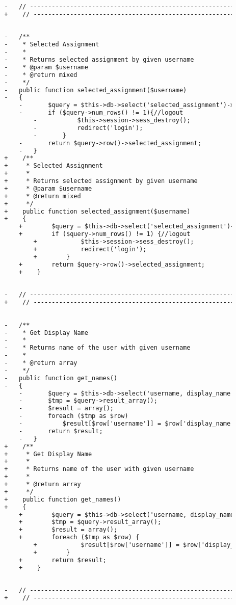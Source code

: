 \begin{lstlisting}[language=diff, caption=Perubahan pada kode User\_model.php]
		
		-	// ------------------------------------------------------------------------
		+    // ------------------------------------------------------------------------
		
		
		-	/**
		-	 * Selected Assignment
		-	 *
		-	 * Returns selected assignment by given username
		-	 * @param $username
		-	 * @return mixed
		-	 */
		-	public function selected_assignment($username)
		-	{
			-		$query = $this->db->select('selected_assignment')->get_where('users', array('username'=>$username));
			-		if ($query->num_rows() != 1){//logout
				-			$this->session->sess_destroy();
				-			redirect('login');
				-		}
			-		return $query->row()->selected_assignment;
			-	}
		+    /**
		+     * Selected Assignment
		+     *
		+     * Returns selected assignment by given username
		+     * @param $username
		+     * @return mixed
		+     */
		+    public function selected_assignment($username)
		+    {
			+        $query = $this->db->select('selected_assignment')->get_where('users', array('username' => $username));
			+        if ($query->num_rows() != 1) {//logout
				+            $this->session->sess_destroy();
				+            redirect('login');
				+        }
			+        return $query->row()->selected_assignment;
			+    }
		
		
		-	// ------------------------------------------------------------------------
		+    // ------------------------------------------------------------------------
		
		
		-	/**
		-	 * Get Display Name
		-	 *
		-	 * Returns name of the user with given username
		-	 *
		-	 * @return array
		-	 */
		-	public function get_names()
		-	{
			-		$query = $this->db->select('username, display_name')->get('users');
			-		$tmp = $query->result_array();
			-		$result = array();
			-		foreach ($tmp as $row)
			-			$result[$row['username']] = $row['display_name'];
			-		return $result;
			-	}
		+    /**
		+     * Get Display Name
		+     *
		+     * Returns name of the user with given username
		+     *
		+     * @return array
		+     */
		+    public function get_names()
		+    {
			+        $query = $this->db->select('username, display_name')->get('users');
			+        $tmp = $query->result_array();
			+        $result = array();
			+        foreach ($tmp as $row) {
				+            $result[$row['username']] = $row['display_name'];
				+        }
			+        return $result;
			+    }
		
		
		-	// ------------------------------------------------------------------------
		+    // ------------------------------------------------------------------------
		

\end{lstlisting}
